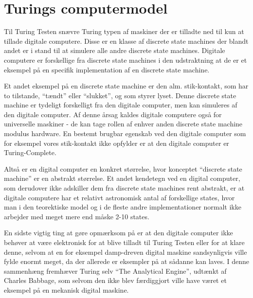 \section{Turings computermodel}
Til Turing Testen snævre Turing typen af maskiner der er tilladte ned til
kun at tillade digitale computere. Disse er en klasse af discrete state
machines der blandt andet er i stand til at simulere alle andre discrete
state machines. Digitale computere er forskellige fra discrete state
machines i den udstraktning at de er et eksempel på en specifik
implementation af en discrete state machine.

Et andet eksempel på en discrete state machine er den alm. stik-kontakt,
som har to tilstande, ``tændt'' eller ``slukket'', og som styrer lyset.
Denne discrete state machine er tydeligt forskelligt fra den digitale
computer, men kan simuleres af den digitale computer.
Af denne årsag kaldes digitale computere også for universelle maskiner -
de kan tage rollen af enhver anden discrete state machine modulus hardware.
En bestemt brugbar egenskab ved den digitale computer som for eksempel vores stik-kontakt
ikke opfylder er at den digitale computer er Turing-Complete.

Altså er en digital computer en konkret størrelse, hvor konceptet ``discrete
state machine'' er en abstrakt størrelse. Et andet kendetegn ved en digital
computer, som derudover ikke adskiller dem fra discrete state machines rent
abstrakt, er at digitale computere har et relativt astronomisk antal af
forskellige states, hvor man i den teorektiske model og i de fleste andre
implementationer normalt ikke arbejder med meget mere end måske 2-10 states.

En sidste vigtig ting at gøre opmærksom på er at den digitale computer ikke
behøver at være elektronisk for at blive tilladt til Turing Testen eller for
at klare denne, selvom at en for eksempel damp-dreven digital maskine sandsynligvis
ville fylde enormt meget, da der allerede er eksempler på at sådanne kan laves.
I denne sammenhæng fremhæver Turing selv ``The Analytical Engine'', udtænkt af
Charles Babbage, som selvom den ikke blev færdiggjort ville have været et eksempel
på en mekanisk digital maskine.
